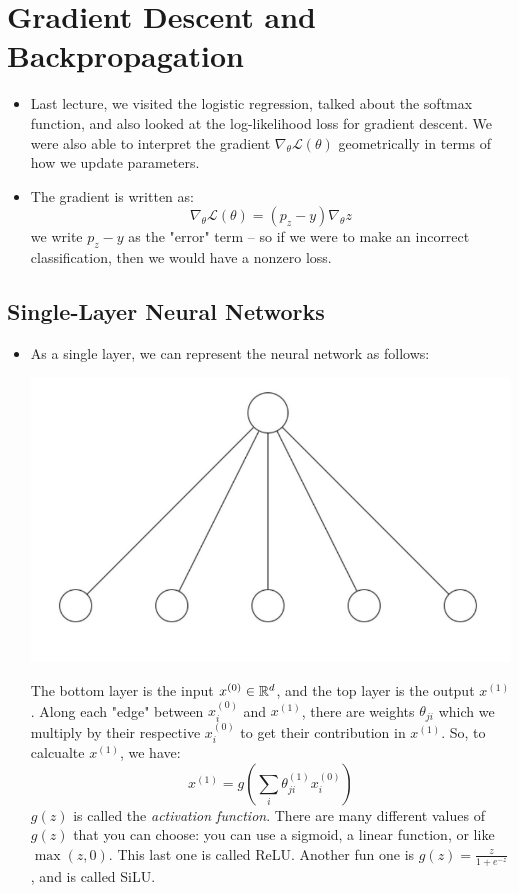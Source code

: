 \section{Gradient Descent and Backpropagation}
\begin{itemize}
	\item Last lecture, we visited the logistic regression, talked about the softmax
		function, and also looked at the log-likelihood loss for gradient descent.
		We were also able to interpret the gradient \(
		\nabla_{\theta}\mathcal{L}(\theta) \) geometrically in terms of how we update
		parameters. 
	\item The gradient is written as:
		\[
			\nabla_{\theta}\mathcal{L}(\theta) = (p_z - y) \nabla_{\theta}z 
		\]
		we write \( p_z - y \) as the "error" term -- so if we were to make an
		incorrect classification, then we would have a nonzero loss.  
\end{itemize}
\subsection{Single-Layer Neural Networks}
\begin{itemize}
	\item As a single layer, we can represent the neural network as follows:
		\begin{center}
			\includegraphics[scale=0.6]{images/one-layer-NN.png}
		\end{center}
		The bottom layer is the input \( x^{(0)} \in \mathbb R^{d}\), and the top layer is 
		the output \( x^{(1)} \). Along each "edge" between \( x_i^{(0)} \) and \(
		x^{(1)} \), there are weights \( \theta_{ji} \) which we multiply by their
		respective \( x_i^{(0)} \) to get their contribution in \( x^{(1)} \). 
		So, to calcualte \( x^{(1)} \), we have:
		\[
			x^{(1)} = g\left( \sum_{i} \theta_{ji}^{(1)}x_i^{(0)} \right)
		\]
		\( g(z) \) is called the \textit{activation function}. 
		There are many different values of \( g(z) \) that you can choose: you can
		use a sigmoid, a linear function, or like \( \max(z, 0) \). This last one is
		called ReLU. Another fun one is \( g(z) = \frac{z}{1 + e^{-z}} \), and is
		called SiLU. 
\end{itemize}
